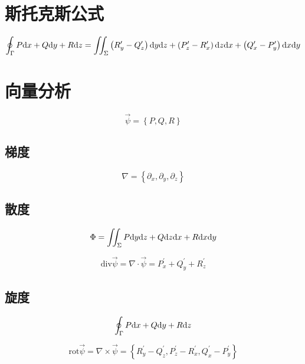 \documentclass{article}
\begin{document}
\section{斯托克斯公式}

\[\oint_\Gamma P\mathrm d x+Q\mathrm d y+R\mathrm d z=\iint_\Sigma
    \left(R_y^\prime-Q_z^\prime\right)\mathrm d y\mathrm d z+
    \left(P_z^\prime-R_x^\prime\right)\mathrm d z\mathrm d x+
    \left(Q_x^\prime-P_y^\prime\right)\mathrm d x\mathrm d y\]

\section{向量分析}

\begin{definition}[向量场]
    \[\vec\psi=\left\{P,Q,R\right\}\]
\end{definition}

\subsection{梯度}

\begin{definition}[梯度]
    \[\nabla=\left\{\partial_x,\partial_y,\partial_z\right\}\]
\end{definition}

\subsection{散度}

\begin{definition}
    \[\Phi=\iint_\Sigma P\mathrm d y\mathrm d z+Q\mathrm d z\mathrm d x+R\mathrm d x\mathrm d y\]
\end{definition}

\begin{theorem}[散度]
    \[\mathrm{div}\vec\psi=
        \nabla\cdot\vec \psi=
        P_x^\prime+Q_y^\prime+R_z^\prime\]
\end{theorem}

\subsection{旋度}

\begin{definition}
    \[\oint_\Gamma P\mathrm d x+Q\mathrm d y+R \mathrm d z\]
\end{definition}

\begin{theorem}[旋度]
    \[\mathrm{rot}\vec\psi=
        \nabla\times\vec\psi=\left\{
        R_y^\prime-Q_z^\prime,
        P_z^\prime-R_x^\prime,
        Q_x^\prime-P_y^\prime
        \right\}\]
\end{theorem}
\end{document}
